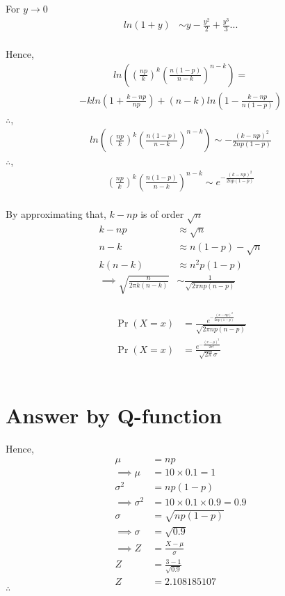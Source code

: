 \documentclass[journal,12pt,twocolumn]{IEEEtran}
\providecommand{\pr}[1]{\ensuremath{\Pr\left(#1\right)}}
\theoremstyle{remark}
\begin{document}
For \( y\to 0\)
\begin{align}
ln(1+y) &\sim y - \frac{y^2}{2} +  \frac{y^3}{3} ...
\end{align}
\\
Hence,
\begin{align}
ln\left(\left(\frac{np}{k}\right)^{k}\left(\frac{n(1-p)}{n-k}\right)^{n-k}\right) = 
\end{align}
\begin{align}
-k ln\left(1 + \frac{k-np}{np}\right) + (n-k)ln\left(1 - \frac{k-np}{n(1-p)}\right)
\end{align}
$\therefore$,
\begin{align}
ln\left(\left(\frac{np}{k}\right)^{k}\left(\frac{n(1-p)}{n-k}\right)^{n-k}\right) \sim - \frac{(k-np)^2}{2np(1-p)}
\end{align}
$\therefore$,
\begin{align}
\left(\frac{np}{k}\right)^{k}\left(\frac{n(1-p)}{n-k}\right)^{n-k} \sim e^{-\frac{(k-np)^2}{2np(1-p)}}
\end{align}
\\
By approximating that, $k-np$ is of order $\sqrt{n}$
\begin{align}
k-np &\approx \sqrt{n}\\
n -k &\approx n(1-p) - \sqrt{n}\\
k(n -k) &\approx n^2p(1-p)\\
\implies
	\sqrt{\frac{n}{2\pi k (n-k)}} &\sim \frac{1}{\sqrt{2\pi np (n-p)}}
\end{align}
\\
\begin{align}
\pr{X = x} &= \frac{e^{-\frac{(x-np)^2}{2np(1-p)}}}{\sqrt{2\pi np (n-p)}} \\
\pr{X = x} &= \frac{e^{-\frac{(x-\mu)^2}{2\sigma^2}}}{\sqrt{2\pi}\sigma}
\end{align}
\\

\section{Answer by Q-function}
Hence,
\begin{align}
	\mu &= np\\
\implies
	\mu &= 10 \times 0.1 = 1\\
	\sigma^{2}&= np(1-p)\\
\implies	
	\sigma^{2}&= 10 \times 0.1 \times 0.9 = 0.9\\
	\sigma&=\sqrt{np(1-p)}\\
\implies
	\sigma&= \sqrt{0.9}\\
\implies
	Z &= \frac{X-\mu}{\sigma}\\
	Z &= \frac{3-1}{\sqrt{0.9}}\\
	Z &= 2.108185107
\end{align}
$\therefore$
\end{document}
